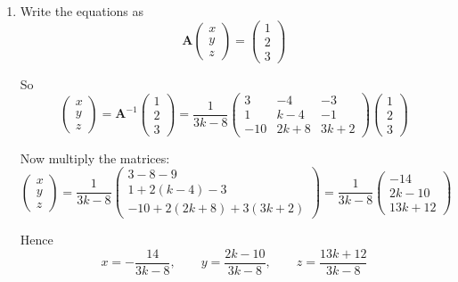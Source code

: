 \documentclass[leqno]{article}
\begin{document}
\begin{enumerate}[
  label=\textbf{\arabic*.},
  leftmargin=*,
  topsep=0pt,
  partopsep=0pt,
  parsep=0pt
]
\begin{djsSolution}
\begin{enumerate}[label=\textbf{(\alph*)}]
  \item Write the equations as
\[
\mathbf{A}\begin{pmatrix}x\\y\\z\end{pmatrix}
=
\begin{pmatrix}1\\2\\3\end{pmatrix}
\]

So
\[
\begin{pmatrix}x\\y\\z\end{pmatrix}
=\mathbf{A}^{-1}\begin{pmatrix}1\\2\\3\end{pmatrix}
=
\frac{1}{3k-8}
\begin{pmatrix}
3 & -4 & -3\\
1 & k-4 & -1\\
-10 & 2k+8 & 3k+2
\end{pmatrix}
\begin{pmatrix}
1\\2\\3
\end{pmatrix}
\]

Now multiply the matrices:
\[
\begin{pmatrix}x\\y\\z\end{pmatrix}
=
\frac{1}{3k-8}
\begin{pmatrix}
3-8-9\\
1+2(k-4)-3\\
-10+2(2k+8)+3(3k+2)
\end{pmatrix}
=
\frac{1}{3k-8}
\begin{pmatrix}
-14\\
2k-10\\
13k+12
\end{pmatrix}
\]

Hence
\[
x=-\frac{14}{3k-8},\qquad
y=\frac{2k-10}{3k-8},\qquad
z=\frac{13k+12}{3k-8}
\]
\end{enumerate}
\end{djsSolution}


\newpage

\questionitem


\end{enumerate}
\end{document}
